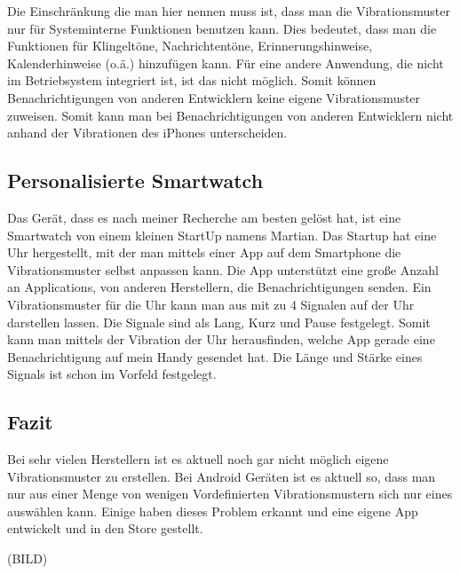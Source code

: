 Die Einschr{\"a}nkung die man hier nennen muss ist, dass man die Vibrationsmuster nur f{\"u}r Systeminterne Funktionen benutzen kann. Dies bedeutet, dass man die Funktionen f{\"u}r Klingelt{\"o}ne, Nachrichtent{\"o}ne, Erinnerungshinweise, Kalenderhinweise (o.{\"a}.) hinzuf{\"u}gen kann. F{\"u}r eine andere Anwendung, die nicht im Betriebsystem integriert ist, ist das nicht m{\"o}glich. Somit k{\"o}nnen Benachrichtigungen von anderen Entwicklern keine eigene Vibrationsmuster zuweisen. Somit kann man bei Benachrichtigungen von anderen Entwicklern nicht anhand der Vibrationen des iPhones  unterscheiden.

\subsection{Personalisierte Smartwatch}
\label{ch:Grundlagen:sec:RelatedWork:subsec:PersonalisierteSmartwatch}

Das Ger{\"a}t, dass es nach meiner Recherche am besten gel{\"o}st hat, ist eine Smartwatch von einem kleinen StartUp namens Martian. 
Das Startup hat eine Uhr hergestellt, mit der man mittels einer App auf dem Smartphone die Vibrationsmuster selbst anpassen kann. 
Die App unterst{\"u}tzt eine gro{\ss}e Anzahl an Applications, von anderen Herstellern, die Benachrichtigungen senden. Ein Vibrationsmuster f{\"u}r die Uhr kann man aus mit zu 4 Signalen auf der Uhr darstellen lassen. Die Signale sind als Lang, Kurz und Pause festgelegt. 
Somit kann man mittels der Vibration der Uhr herausfinden, welche App gerade eine Benachrichtigung auf mein Handy gesendet hat. Die L{\"a}nge und St{\"a}rke eines Signals ist schon im Vorfeld festgelegt.

\subsection{Fazit}
\label{ch:Grundlagen:sec:RelatedWork:subsec:PersonalisierteSmartwatch}
Bei sehr vielen Herstellern ist es aktuell noch gar nicht m{\"o}glich eigene Vibrationsmuster zu erstellen. Bei Android Ger{\"a}ten ist es aktuell so, dass man nur aus einer Menge von wenigen Vordefinierten Vibrationsmustern sich nur eines ausw{\"a}hlen kann. Einige haben dieses Problem erkannt und eine eigene App entwickelt und in den Store gestellt.

(BILD)
